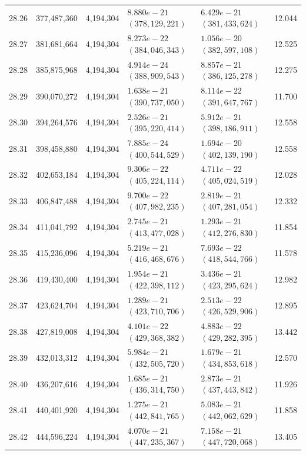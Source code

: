 \documentclass[11pt]{article}
\theoremstyle{definition}
\begin{document}
\begin{longtable}{@{}c r r >{\raggedleft\arraybackslash}p{34mm} >{\raggedleft\arraybackslash}p{34mm} r@{}}
28.26 & 377{,}487{,}360 & 4{,}194{,}304 & $8.880e-21$ $(378{,}129{,}221)$ & $6.429e-21$ $(381{,}433{,}624)$ & 12.044 \\
28.27 & 381{,}681{,}664 & 4{,}194{,}304 & $8.273e-22$ $(384{,}046{,}343)$ & $1.056e-20$ $(382{,}597{,}108)$ & 12.525 \\
28.28 & 385{,}875{,}968 & 4{,}194{,}304 & $4.914e-24$ $(388{,}909{,}543)$ & $8.857e-21$ $(386{,}125{,}278)$ & 12.275 \\
28.29 & 390{,}070{,}272 & 4{,}194{,}304 & $1.638e-21$ $(390{,}737{,}050)$ & $8.114e-22$ $(391{,}647{,}767)$ & 11.700 \\
28.30 & 394{,}264{,}576 & 4{,}194{,}304 & $2.526e-21$ $(395{,}220{,}414)$ & $5.912e-21$ $(398{,}186{,}911)$ & 12.558 \\
28.31 & 398{,}458{,}880 & 4{,}194{,}304 & $7.885e-24$ $(400{,}544{,}529)$ & $1.694e-20$ $(402{,}139{,}190)$ & 12.558 \\
28.32 & 402{,}653{,}184 & 4{,}194{,}304 & $9.306e-22$ $(405{,}224{,}114)$ & $4.711e-22$ $(405{,}024{,}519)$ & 12.028 \\
28.33 & 406{,}847{,}488 & 4{,}194{,}304 & $9.700e-22$ $(407{,}982{,}235)$ & $2.819e-21$ $(407{,}281{,}054)$ & 12.332 \\
28.34 & 411{,}041{,}792 & 4{,}194{,}304 & $2.745e-21$ $(413{,}477{,}028)$ & $1.293e-21$ $(412{,}276{,}830)$ & 11.854 \\
28.35 & 415{,}236{,}096 & 4{,}194{,}304 & $5.219e-21$ $(416{,}468{,}676)$ & $7.693e-22$ $(418{,}544{,}766)$ & 11.578 \\
28.36 & 419{,}430{,}400 & 4{,}194{,}304 & $1.954e-21$ $(422{,}398{,}112)$ & $3.436e-21$ $(423{,}295{,}624)$ & 12.982 \\
28.37 & 423{,}624{,}704 & 4{,}194{,}304 & $1.289e-21$ $(423{,}710{,}706)$ & $2.513e-22$ $(426{,}529{,}906)$ & 12.895 \\
28.38 & 427{,}819{,}008 & 4{,}194{,}304 & $4.101e-22$ $(429{,}368{,}382)$ & $4.883e-22$ $(429{,}282{,}395)$ & 13.442 \\
28.39 & 432{,}013{,}312 & 4{,}194{,}304 & $5.984e-21$ $(432{,}505{,}720)$ & $1.679e-21$ $(434{,}853{,}618)$ & 12.570 \\
28.40 & 436{,}207{,}616 & 4{,}194{,}304 & $1.685e-21$ $(436{,}314{,}750)$ & $2.873e-21$ $(437{,}443{,}842)$ & 11.926 \\
28.41 & 440{,}401{,}920 & 4{,}194{,}304 & $1.275e-21$ $(442{,}841{,}765)$ & $5.083e-21$ $(442{,}062{,}629)$ & 11.858 \\
28.42 & 444{,}596{,}224 & 4{,}194{,}304 & $4.070e-21$ $(447{,}235{,}367)$ & $7.158e-21$ $(447{,}720{,}068)$ & 13.405 \\

\end{longtable}
\end{document}
